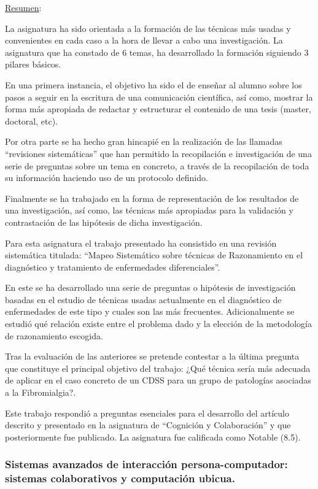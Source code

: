\documentclass[runningheads,a4paper]{llncs}
\theoremstyle{break}
\begin{document}
\pagebreak

\underline{Resumen}:

La asignatura ha sido orientada a la formación de las técnicas más usadas y convenientes en cada caso a la hora de llevar a cabo una investigación. La asignatura que ha constado de 6 temas, ha desarrollado la formación siguiendo 3 pilares básicos.

En una primera instancia, el objetivo ha sido el de enseñar al alumno sobre los pasos a seguir en la escritura de una comunicación científica, así como, mostrar la forma más apropiada de redactar y estructurar el contenido
de una tesis (master, doctoral, etc).

Por otra parte se ha hecho gran hincapié en la realización de las llamadas ``revisiones sistemáticas'' que han permitido la recopilación e investigación de una serie de preguntas sobre un tema en concreto, a través de la recopilación de toda su información haciendo uso de un protocolo definido.

Finalmente se ha trabajado en la forma de representación de los resultados de una investigación, así como, las técnicas más apropiadas para la validación y contrastación de las hipótesis de dicha investigación.

Para esta asignatura el trabajo presentado ha consistido en una revisión sistemática titulada: ``Mapeo Sistemático sobre técnicas de Razonamiento en el diagnóstico y tratamiento de enfermedades diferenciales''. 

En este se ha desarrollado una serie de preguntas o hipótesis de investigación basadas en el estudio de técnicas usadas actualmente en el diagnóstico de enfermedades de este tipo y cuales son las más frecuentes. Adicionalmente se estudió qué relación existe entre el problema dado y la elección de la metodología de razonamiento escogida. 

Tras la evaluación de las anteriores se pretende contestar a la última pregunta que constituye el principal objetivo del trabajo: ¿Qué técnica sería más adecuada de aplicar en el caso concreto de un CDSS para un grupo de patologías asociadas a la Fibromialgia?. 

Este trabajo respondió a preguntas esenciales para el desarrollo del artículo descrito y presentado en la asignatura de ``Cognición y Colaboración'' y que posteriormente fue publicado. La asignatura fue calificada como Notable (8.5).

\newpage
\subsubsection{Sistemas avanzados de interacción persona-computador: sistemas colaborativos y computación ubicua.}
\textbf{}
\end{document}
